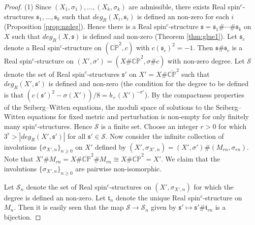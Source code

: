 \documentclass{amsart}
\theoremstyle{definition}
\theoremstyle{remark}
\numberwithin{equation}{section}
\begin{document}
\begin{proof}
(1) Since $(X_1,\sigma_1), \dots , (X_k , \sigma_k)$ are admissible, there exists Real spin$^c$-structures $\mathfrak{s}_1, \dots , \mathfrak{s}_k$ such that $deg_R(X_i , \mathfrak{s}_i)$ is defined an non-zero for each $i$ (Proposition \ref{prop:nzdeg}). Hence there is a Real spin$^c$-structure $\mathfrak{s} = \mathfrak{s}_1 \# \cdots \# \mathfrak{s}_k$ on $X$ such that $deg_R(X , \mathfrak{s})$ is defined and non-zero (Theorem \ref{thm:glue1}). Let $\mathfrak{s}_c$ denote a Real spin$^c$-structure on $(\overline{\mathbb{CP}}^2,c)$ with $c(\mathfrak{s}_c)^2 = -1$. Then $\mathfrak{s} \# \mathfrak{s}_c$ is a Real spin$^c$-structure on $(X' , \sigma') = (X \# \overline{\mathbb{CP}}^2 , \sigma \# c )$ with non-zero degree. Let $\mathcal{S}$ denote the set of Real spin$^c$-structures $\mathfrak{s}'$ on $X' = X \# \overline{\mathbb{CP}}^2$ such that $deg_R( X' , \mathfrak{s}')$ is defined and non-zero (the condition for the degree to be defined is that $(c(\mathfrak{s}')^2 - \sigma(X'))/8 = b_+(X')^{-\sigma'}$). By the compactness properties of the Seiberg--Witten equations, the moduli space of solutions to the Seiberg--Witten equations for fixed metric and perturbation is non-empty for only finitely many spin$^c$-structures. Hence $\mathcal{S}$ is a finite set. Choose an integer $r > 0$ for which $3^r > |deg_R(X' , \mathfrak{s}')|$ for all $\mathfrak{s}' \in \mathcal{S}$. Now consider the infinite collection of involutions $\{ \sigma_{X',n} \}_{n \ge 0}$ on $X'$ defined by $(X' , \sigma_{X',n}) = ( X' , \sigma' ) \# (M_{rn} , \sigma_{rn})$. Note that $X' \# M_{rn} = X \# \overline{\mathbb{CP}}^2 \# M_{rn} \cong X \# \overline{\mathbb{CP}}^2 = X'$. We claim that the involutions $\{ \sigma_{X',n} \}_{n \ge 0}$ are pairwise non-isomorphic.

Let $\mathcal{S}_n$ denote the set of Real spin$^c$-structures on $(X' , \sigma_{X',n})$ for which the degree is defined an non-zero. Let $\mathfrak{t}_n$ denote the unique Real spin$^c$-structure on $M_{n}$. Then it is easily seen that the map $\mathcal{S} \to \mathcal{S}_n$ given by $\mathfrak{s}' \mapsto \mathfrak{s}' \# \mathfrak{t}_{rn}$ is a bijection.


\end{proof}
\end{document}
